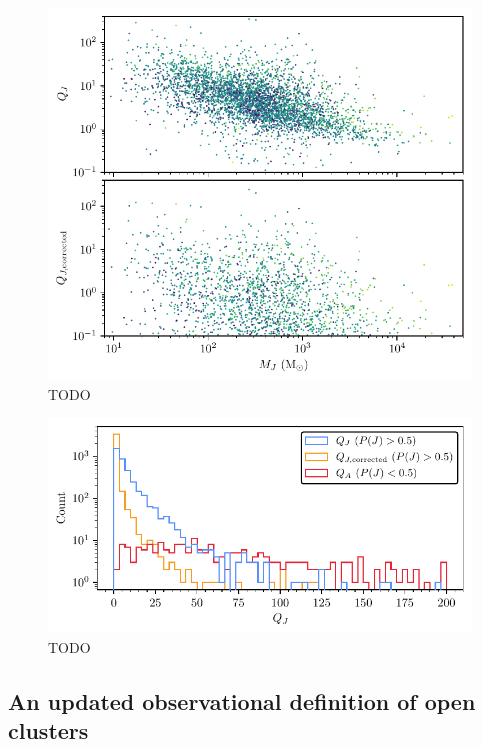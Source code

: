 \begin{figure}[t]
    \centering
    \includegraphics[width=\textwidth]{fig/c4/results_virial_vs_mass.pdf}
    \caption[TODO]{TODO}
    \label{fig:dynamics:results:virial_vs_mass}
 \end{figure}

\begin{figure}[t]
    \centering
    \includegraphics[width=\textwidth]{fig/c4/results_q_distribution.pdf}
    \caption[TODO]{TODO}
    \label{fig:dynamics:results:virial_ratio_distribution}
\end{figure}


\subsection{An updated observational definition of open clusters}
\label{sec:dynamics:results:definition}

